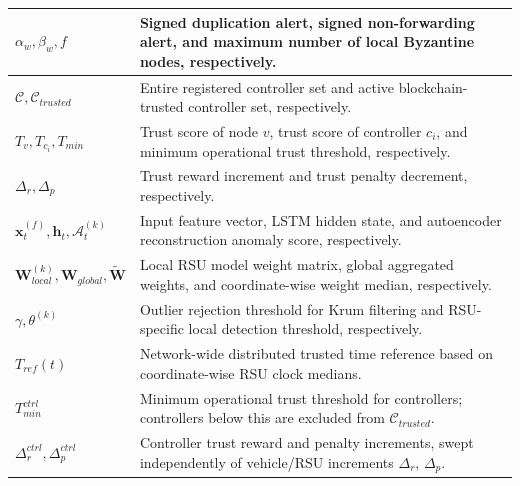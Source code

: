 \documentclass[12pt, a4paper]{report}
\begin{document}
\begin{table}[H]
\begin{center}
\begin{tabular}{| m{2.50cm} | m{8.5cm} |}
                        \hline
                        $\alpha_w, \beta_w, f$ & Signed duplication alert, signed non-forwarding alert, and maximum number of local Byzantine nodes, respectively. \\
                        \hline
                        $\mathcal{C}, \mathcal{C}_{trusted}$ & Entire registered controller set and active blockchain-trusted controller set, respectively. \\
                        \hline
                        $T_v, T_{c_i}, T_{min}$ & Trust score of node $v$, trust score of controller $c_i$, and minimum operational trust threshold, respectively. \\
                        \hline
                        $\Delta_r, \Delta_p$ & Trust reward increment and trust penalty decrement, respectively. \\
                        \hline
                        $\mathbf{x}_t^{(f)}, \mathbf{h}_t, \mathcal{A}_t^{(k)}$ & Input feature vector, LSTM hidden state, and autoencoder reconstruction anomaly score, respectively. \\
                        \hline
                        $\mathbf{W}_{local}^{(k)}, \mathbf{W}_{global}, \tilde{\mathbf{W}}$ & Local RSU model weight matrix, global aggregated weights, and coordinate-wise weight median, respectively. \\
                        \hline
                        $\gamma, \theta^{(k)}$ & Outlier rejection threshold for Krum filtering and RSU-specific local detection threshold, respectively. \\
                        \hline
                        $T_{ref}(t)$ & Network-wide distributed trusted time reference based on coordinate-wise RSU clock medians. \\
                          \hline
                        $T_{min}^{ctrl}$ &
                        Minimum operational trust
                        threshold for controllers;
                        controllers below this are
                        excluded from
                        $\mathcal{C}_{trusted}$. \\
                        \hline
                        $\Delta_r^{ctrl},
                        \Delta_p^{ctrl}$ &
                        Controller trust reward and
                        penalty increments, swept
                        independently of vehicle/RSU
                        increments $\Delta_r$,
                        $\Delta_p$. \\

\end{tabular}
\end{center}
\end{table}
\end{document}
